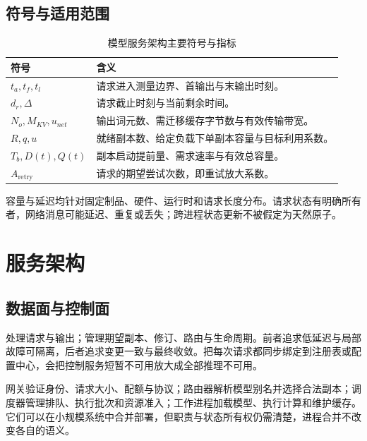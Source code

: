\documentclass[../textbook.tex]{subfiles}
\begin{document}
\subsection{符号与适用范围}
\begin{table}[htbp]
\centering
\caption{模型服务架构主要符号与指标}\label{tab:serving-symbols}
\begin{tabular}{ll}
\toprule
符号 & 含义\\
\midrule
$t_a,t_f,t_l$ & 请求进入测量边界、首输出与末输出时刻。\\
$d_r,\Delta$ & 请求截止时刻与当前剩余时间。\\
$N_o,M_{KV},u_{net}$ & 输出词元数、需迁移缓存字节数与有效传输带宽。\\
$R,q,u$ & 就绪副本数、给定负载下单副本容量与目标利用系数。\\
$T_b,D(t),Q(t)$ & 副本启动提前量、需求速率与有效总容量。\\
$A_{\mathrm{retry}}$ & 请求的期望尝试次数，即重试放大系数。\\
\bottomrule
\end{tabular}
\end{table}

\begin{assumption}[服务分析的口径]
容量与延迟均针对固定制品、硬件、运行时和请求长度分布。请求状态有明确所有者，网络消息可能延迟、重复或丢失；跨进程状态更新不被假定为天然原子。
\end{assumption}

\section{服务架构}

\subsection{数据面与控制面}
处理请求与输出；管理期望副本、修订、路由与生命周期。前者追求低延迟与局部故障可隔离，后者追求变更一致与最终收敛。把每次请求都同步绑定到注册表或配置中心，会把控制服务短暂不可用放大成全部推理不可用。

网关验证身份、请求大小、配额与协议；路由器解析模型别名并选择合法副本；调度器管理排队、执行批次和资源准入；工作进程加载模型、执行计算和维护缓存。它们可以在小规模系统中合并部署，但职责与状态所有权仍需清楚，进程合并不改变各自的语义。
\end{document}
